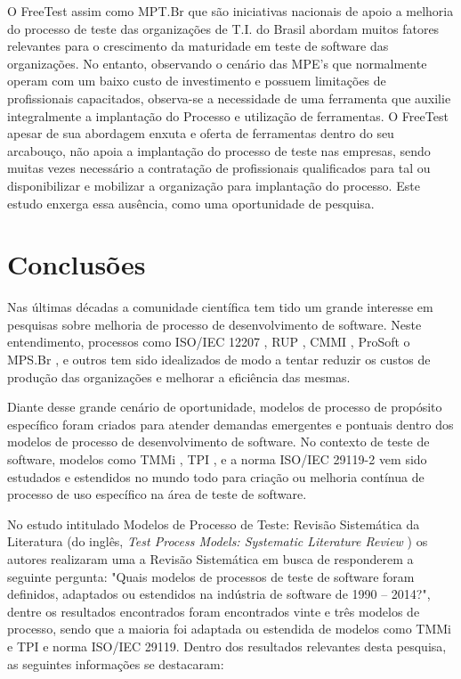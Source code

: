 O FreeTest assim como MPT.Br que são iniciativas nacionais de apoio a melhoria do processo de teste das organizações de T.I. do Brasil abordam muitos fatores relevantes para o crescimento da maturidade em teste de software das organizações. No entanto, observando o cenário das MPE's que normalmente operam com um baixo custo de investimento e possuem limitações de profissionais capacitados, observa-se a necessidade de uma ferramenta que auxilie integralmente a implantação do Processo e utilização de ferramentas. O FreeTest apesar de sua abordagem enxuta e oferta de ferramentas dentro do seu arcabouço, não apoia a implantação do processo de teste nas empresas, sendo muitas vezes necessário a contratação de profissionais qualificados para tal ou disponibilizar e mobilizar a organização para implantação do processo. Este estudo enxerga essa ausência, como uma oportunidade de pesquisa.

\section{Conclusões}
\label{conclusoes}

Nas últimas décadas a comunidade científica tem tido um grande interesse em pesquisas sobre melhoria de processo de desenvolvimento de software. Neste entendimento, processos como ISO/IEC 12207 \cite{Mitasiunas2014}, RUP \cite{Veenendaal2012}, CMMI \cite{cmmi}, ProSoft \cite{Mitasiunas2014} o MPS.Br \cite{Softex}, e outros tem sido idealizados de modo a tentar reduzir os custos de produção das organizações e melhorar a eficiência das mesmas.

Diante desse grande cenário de oportunidade, modelos de processo de propósito específico foram criados para atender demandas emergentes e pontuais dentro dos modelos de processo de desenvolvimento de software. No contexto de teste de software, modelos como TMMi \cite{Veenendaal2012}, TPI \cite{Mitasiunas2014}, e a norma ISO/IEC 29119-2 \cite{Standard2013} vem sido estudados e estendidos no mundo todo para criação ou melhoria contínua de processo de uso específico na área de teste de software.

No estudo intitulado Modelos de Processo de Teste: Revisão Sistemática da Literatura (do inglês, \textit{Test Process Models: Systematic Literature Review} \cite{Carlo2010}) os autores realizaram uma a Revisão Sistemática em busca de responderem a seguinte pergunta: "Quais modelos de processos de teste de software foram definidos, adaptados ou estendidos na indústria de software de 1990 – 2014?", dentre os resultados encontrados foram encontrados vinte e três modelos de processo, sendo que a maioria foi adaptada ou estendida de modelos como TMMi e TPI e norma ISO/IEC 29119. Dentro dos resultados relevantes desta pesquisa, as seguintes informações se destacaram:

